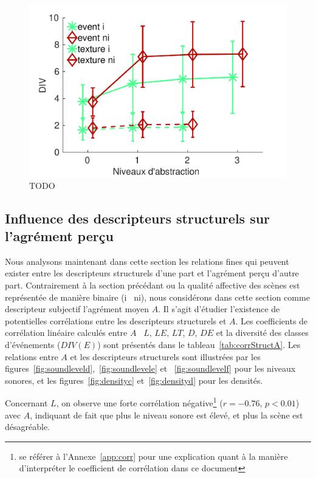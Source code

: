 \begin{figure}[t]
        \myfloatalign
        \includegraphics[width=.9\linewidth]{gfxXpUrbanSoundscape/xp1_div_1}
       \caption[TODO]{TODO}\label{fig:diversity}
\end{figure}

\subsection{Influence des descripteurs structurels sur l'agrément perçu}
\label{sec:ch5_corrDesStruct}

Nous analysons maintenant dans cette section les relations fines qui peuvent exister entre les descripteurs structurels d'une part et l'agrément perçu d'autre part. Contrairement à la section précédant ou la qualité affective des scènes est représentée de manière binaire (i \vs~ni), nous considérons dans cette section comme descripteur subjectif l'agrément moyen $A$. Il s'agit d'étudier l'existence de potentielles corrélations entre les descripteurs structurels et $A$. Les coefficients de corrélation linéaire calculés entre $A$ \vs~$L$, $LE$, $LT$, $D$, $DE$ et la diversité des classes d'événements ($DIV(E)$) sont présentés dans le tableau~\ref{tab:corrStructA}. Les relations entre $A$ et les descripteurs structurels sont illustrées par les figures~\ref{fig:soundleveld},~\ref{fig:soundlevele} et ~\ref{fig:soundlevelf} pour les niveaux sonores, et les figures~\ref{fig:densityc} et~\ref{fig:densityd} pour les densités. 


Concernant $L$, on observe une forte corrélation négative\footnote{se référer à l'Annexe~\ref{app:corr} pour une explication quant à la manière d'interpréter le coefficient de corrélation dans ce document}  ($r=-0.76$, $p<0.01$) avec $A$, indiquant de fait que plus le niveau sonore est élevé, et plus la scène est désagréable.


